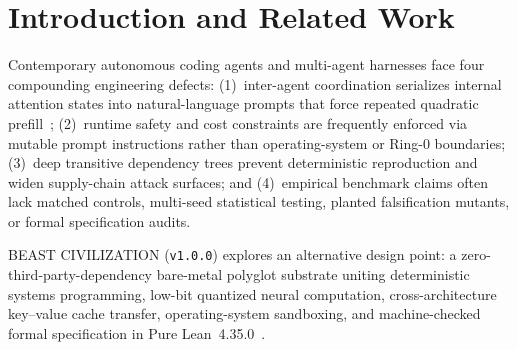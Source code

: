 \documentclass[11pt,letterpaper]{amsart}
\newcommand{\code}[1]{{\small\texttt{#1}}}
\newcommand{\GF}{\mathbb{F}}
\begin{document}
\begin{abstract}
differentiation ($0.00 \times 10^0$ discrepancy), and Planaria $\GF(2^8)$+Merkle
$50\%$ damage healing. Formal verification is structured under a strict Palomar
\code{Spec}/\code{Challenge}/\code{Solution} separation comprising $81/81$ Pure
Lean~4.35.0 declarations ($65$ domain theorems, $8$ non-vacuity witnesses, and $8$
adversarial false-variant refutations) audited strictly within standard axioms
(\code{propext}, \code{Classical.choice}, \code{Quot.sound}) across six
independent Lean proof kernels with live negative sorry-tamper rejection, paired
with $33/33$ live gates, $40/40$ caught runtime planted mutants, $29/29$ Rust
workspace and $1{,}000$-case fuzz tests, and $3{,}000$ randomized property checks.
We state explicit epistemic boundaries: $296/300$ ($98.7\%$) capability matrix
items are live-verified, $4/300$ remain honestly marked \code{SPEC}, native binary
memory safety lies outside the Lean kernel boundary, and $0/1{,}900$ overarching
open problems in the Unsolved Problems Mega-Atlas (\code{v2.8.0}, commit
\code{9e16554}) are claimed retired.
\end{abstract}

\maketitle

\section{Introduction and Related Work}
\label{sec:intro}

Contemporary autonomous coding agents and multi-agent harnesses face four
compounding engineering defects: (1)~inter-agent coordination serializes internal
attention states into natural-language prompts that force repeated quadratic
prefill~\cite{vaswani2017attention}; (2)~runtime safety and cost constraints are
frequently enforced via mutable prompt instructions rather than operating-system
or Ring-0 boundaries; (3)~deep transitive dependency trees prevent deterministic
reproduction and widen supply-chain attack surfaces; and (4)~empirical benchmark
claims often lack matched controls, multi-seed statistical testing, planted
falsification mutants, or formal specification audits.

\textsc{BEAST CIVILIZATION} (\code{v1.0.0}) explores an alternative design point:
a zero-third-party-dependency bare-metal polyglot substrate uniting deterministic
systems programming, low-bit quantized neural computation, cross-architecture
key--value cache transfer, operating-system sandboxing, and machine-checked formal
specification in Pure Lean~4.35.0~\cite{moura2021lean4}.
\end{document}

